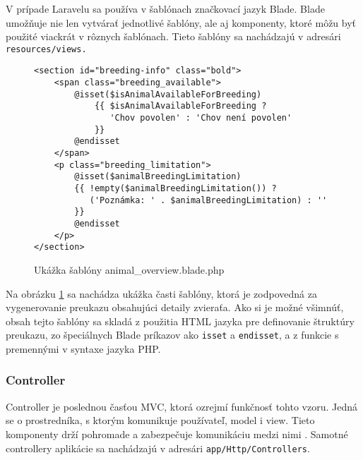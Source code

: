 V prípade Laravelu sa používa v šablónach značkovací jazyk Blade. Blade umožňuje nie len vytvárať jednotlivé šablóny, ale aj komponenty, ktoré môžu byť použité viackrát v rôznych šablónach. Tieto šablóny sa nachádzajú v adresári \texttt{resources/views.}

\begin{figure}[H]
\begin{minipage}[]{\linewidth}
\begin{verbatim}
<section id="breeding-info" class="bold">
    <span class="breeding_available">
        @isset($isAnimalAvailableForBreeding)
            {{ $isAnimalAvailableForBreeding ?
               'Chov povolen' : 'Chov není povolen' 
            }}
        @endisset
    </span>
    <p class="breeding_limitation">
        @isset($animalBreedingLimitation)
        {{ !empty($animalBreedingLimitation()) ?
           ('Poznámka: ' . $animalBreedingLimitation) : '' 
        }}
        @endisset
    </p>
</section>
\end{verbatim}
\end{minipage}
\caption[Ukážka šablóny animal\_overview.blade.php]
{Ukážka šablóny animal\_overview.blade.php}
\label{animal-overview-view-code}
\end{figure}

Na obrázku \ref{animal-overview-view-code} sa nachádza ukážka časti šablóny, ktorá je zodpovedná za vygenerovanie preukazu obsahujúci detaily zvieraťa. Ako si je možné všimnúť, obsah tejto šablóny sa skladá z použitia HTML jazyka pre definovanie štruktúry preukazu, zo špeciálnych Blade príkazov ako \texttt{isset} a \texttt{endisset}, a z funkcie s premennými v syntaxe jazyka PHP.\pagebreak

\subsubsection{Controller}
Controller je poslednou časťou MVC, ktorá ozrejmí funkčnosť tohto vzoru. Jedná se o prostredníka, s ktorým komunikuje používateľ, model i view. Tieto komponenty drží pohromade a zabezpečuje komunikáciu medzi nimi \cite{mvc-architektura}. Samotné controllery aplikácie sa nachádzajú v adresári \texttt{app/Http/Controllers}.

